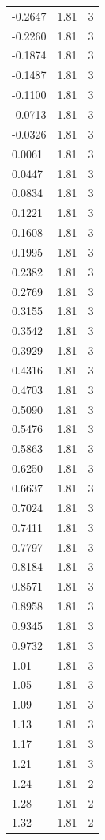 \begin{longtable}{lrr}
  -0.2647 & 1.81 & 3 \\
  -0.2260 & 1.81 & 3 \\
  -0.1874 & 1.81 & 3 \\
  -0.1487 & 1.81 & 3 \\
  -0.1100 & 1.81 & 3 \\
  -0.0713 & 1.81 & 3 \\
  -0.0326 & 1.81 & 3 \\
  0.0061 & 1.81 & 3 \\
  0.0447 & 1.81 & 3 \\
  0.0834 & 1.81 & 3 \\
  0.1221 & 1.81 & 3 \\
  0.1608 & 1.81 & 3 \\
  0.1995 & 1.81 & 3 \\
  0.2382 & 1.81 & 3 \\
  0.2769 & 1.81 & 3 \\
  0.3155 & 1.81 & 3 \\
  0.3542 & 1.81 & 3 \\
  0.3929 & 1.81 & 3 \\
  0.4316 & 1.81 & 3 \\
  0.4703 & 1.81 & 3 \\
  0.5090 & 1.81 & 3 \\
  0.5476 & 1.81 & 3 \\
  0.5863 & 1.81 & 3 \\
  0.6250 & 1.81 & 3 \\
  0.6637 & 1.81 & 3 \\
  0.7024 & 1.81 & 3 \\
  0.7411 & 1.81 & 3 \\
  0.7797 & 1.81 & 3 \\
  0.8184 & 1.81 & 3 \\
  0.8571 & 1.81 & 3 \\
  0.8958 & 1.81 & 3 \\
  0.9345 & 1.81 & 3 \\
  0.9732 & 1.81 & 3 \\
  1.01 & 1.81 & 3 \\
  1.05 & 1.81 & 3 \\
  1.09 & 1.81 & 3 \\
  1.13 & 1.81 & 3 \\
  1.17 & 1.81 & 3 \\
  1.21 & 1.81 & 3 \\
  1.24 & 1.81 & 2 \\
  1.28 & 1.81 & 2 \\
  1.32 & 1.81 & 2 \\

\end{longtable}
